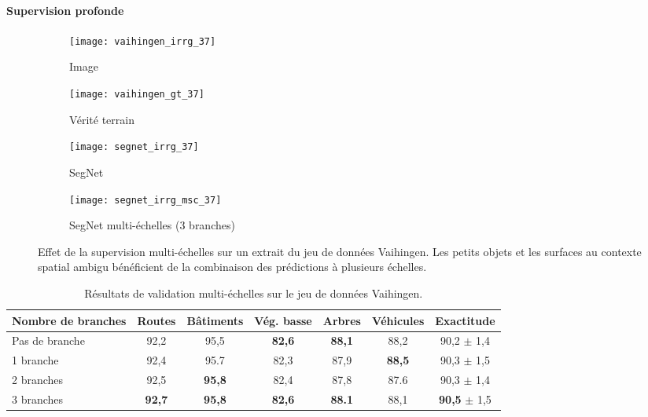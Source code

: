 \paragraph{Supervision profonde}

\begin{figure}[!htb]
	\hfill
	\begin{subfigure}{0.48\textwidth}
    \texttt{[image: vaihingen\_irrg\_37]}
    \caption{Image }
    \end{subfigure}
    \hfill
    \begin{subfigure}{0.48\textwidth}
    \texttt{[image: vaihingen\_gt\_37]}
    \caption{Vérité terrain}
    \end{subfigure}
    \hfill

    \hfill
    \begin{subfigure}{0.48\textwidth}
    \texttt{[image: segnet\_irrg\_37]}
    \caption{SegNet}
    \end{subfigure}
    \hfill
    \begin{subfigure}{0.48\textwidth}
    \texttt{[image: segnet\_irrg\_msc\_37]}
    \caption{SegNet multi-échelles (3 branches)}
    \end{subfigure}
    \hfill
    \caption[Effet de la supervision multi-échelles sur un extrait du jeu de données  Vaihingen.]{Effet de la supervision multi-échelles sur un extrait du jeu de données  Vaihingen. Les petits objets et les surfaces au contexte spatial ambigu bénéficient de la combinaison des prédictions à plusieurs échelles.\\
		\isprslegende}
    \label{fig:vaihingen_images}
\end{figure}

\begin{table}
    \caption{Résultats de validation multi-échelles sur le jeu de données  Vaihingen.}
    \label{tab:dsn_vaihingen}
	\begin{tabularx}{\textwidth}{Y c c c c c c}
    \toprule
    Nombre de branches & Routes & Bâtiments & Vég. basse & Arbres & Véhicules & Exactitude\\
    \midrule
    Pas de branche & 92,2 & 95,5 & \textbf{82,6} & \textbf{88,1} & 88,2 & 90,2 {\small $\pm$ 1,4}\\
    1 branche & 92,4 & 95.7 & 82,3 & 87,9 & \textbf{88,5} & 90,3 {\small $\pm$ 1,5}\\
    2 branches & 92,5 & \textbf{95,8} & 82,4 & 87,8 & 87.6 & 90,3 {\small $\pm$ 1,4}\\
    3 branches & \textbf{92,7} & \textbf{95,8} & \textbf{82,6} & \textbf{88.1} & 88,1 & \textbf{90,5} {\small $\pm$ 1,5}\\
    \bottomrule
    \end{tabularx}
\end{table}


